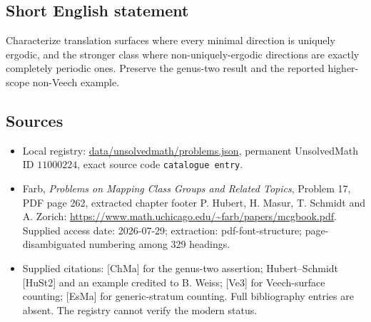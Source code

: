 \documentclass[11pt]{article}
\begin{document}
\subsection{Short English statement}
Characterize translation surfaces where every minimal direction is uniquely ergodic, and the stronger class where non-uniquely-ergodic directions are exactly completely periodic ones. Preserve the genus-two result and the reported higher-scope non-Veech example.
\subsection{Sources}
\begin{itemize}
\item Local registry: \url{data/unsolvedmath/problems.json}, permanent UnsolvedMath ID $11000224$, exact source code \texttt{catalogue entry}.
\item Farb, \emph{Problems on Mapping Class Groups and Related Topics}, Problem 17, PDF page 262, extracted chapter footer P. Hubert, H. Masur, T. Schmidt and A. Zorich: \url{https://www.math.uchicago.edu/~farb/papers/mcgbook.pdf}. Supplied access date: 2026-07-29; extraction: pdf-font-structure; page-disambiguated numbering among 329 headings.
\item Supplied citations: [ChMa] for the genus-two assertion; Hubert--Schmidt [HuSt2] and an example credited to B. Weiss; [Ve3] for Veech-surface counting; [EsMa] for generic-stratum counting. Full bibliography entries are absent. The registry cannot verify the modern status.
\end{itemize}
\end{document}
